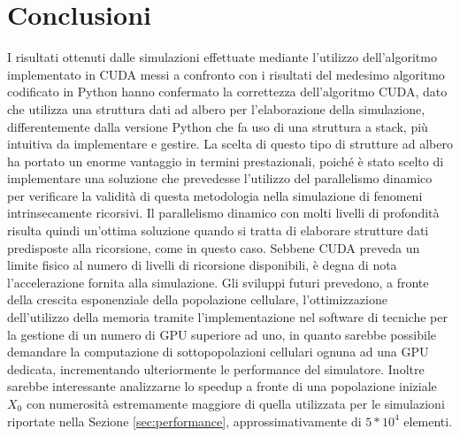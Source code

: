 
\chapter{Conclusioni} %

\label{Conclusioni} %



I risultati ottenuti dalle simulazioni effettuate mediante
l'utilizzo dell'algoritmo implementato in CUDA messi a confronto con i
risultati del medesimo algoritmo codificato in Python hanno confermato
la correttezza dell'algoritmo CUDA, dato che utilizza una struttura dati
ad albero per l'elaborazione della simulazione, differentemente dalla versione
Python che fa uso di una struttura a stack, più intuitiva da implementare e
gestire. La scelta di questo tipo di strutture ad albero ha portato un enorme
vantaggio in termini prestazionali, poiché è stato scelto di implementare
una soluzione che prevedesse l'utilizzo del parallelismo dinamico per
verificare la validità di questa metodologia nella simulazione di fenomeni
intrinsecamente ricorsivi. Il parallelismo dinamico con molti livelli
di profondità risulta quindi un'ottima soluzione quando si tratta di elaborare
strutture dati predisposte alla ricorsione, come in questo caso. Sebbene CUDA
preveda un limite fisico al numero di livelli di ricorsione disponibili, è
degna di nota l'accelerazione fornita alla simulazione.
Gli sviluppi futuri prevedono, a fronte della crescita esponenziale della 
popolazione cellulare, l'ottimizzazione dell'utilizzo della memoria 
tramite l'implementazione nel software di tecniche per la gestione di un numero 
di GPU superiore ad uno, in quanto sarebbe possibile demandare la computazione 
di sottopopolazioni cellulari ognuna ad una GPU dedicata, incrementando 
ulteriormente le performance del simulatore. Inoltre sarebbe interessante 
analizzarne lo speedup a fronte di una popolazione iniziale $X_{0}$ con 
numerosità estremamente maggiore di quella utilizzata per le simulazioni 
riportate nella Sezione \ref{sec:performance}, approssimativamente di $5*10^4$
elementi.

